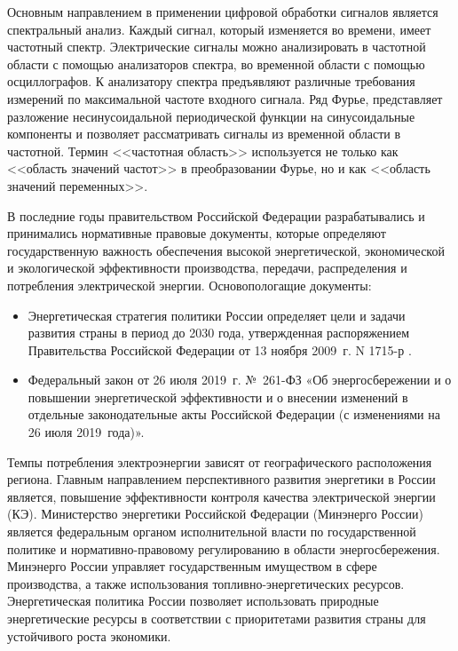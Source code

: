 Основным направлением в применении цифровой обработки сигналов является спектральный анализ. Каждый сигнал, который изменяется во времени, имеет частотный спектр. Электрические сигналы можно анализировать в частотной области с помощью анализаторов спектра, во временной области с помощью осциллографов. К анализатору спектра предъявляют различные требования измерений по максимальной  частоте входного сигнала. Ряд Фурье, представляет разложение несинусоидальной периодической функции на синусоидальные компоненты и позволяет рассматривать сигналы из временной области в частотной. Термин <<частотная область>> используется не только как <<область значений частот>> в преобразовании Фурье, но и как <<область значений переменных>>.

В последние годы правительством Российской Федерации разрабатывались и принимались нормативные правовые документы, которые
определяют государственную важность обеспечения высокой
энергетической, экономической и экологической эффективности производства,
передачи, распределения и потребления электрической энергии. Основопологащие документы:
\begin{itemize}
	\item Энергетическая стратегия политики России определяет цели и задачи развития страны в период до 2030 года, утвержденная распоряжением Правительства Российской Федерации от 13 ноября 2009~г. N 1715-р \cite{energy_strategy}. 
	\item Федеральный закон от 26 июля 2019~г. №~261-ФЗ «Об энергосбережении и о повышении энергетической эффективности и о внесении изменений в отдельные законодательные акты Российской Федерации (с изменениями на 26 июля 2019~года)»\cite{energy_saving_law_2019}.
\end{itemize}


Темпы потребления электроэнергии зависят от географического расположения региона. Главным направлением перспективного развития энергетики в России является, повышение эффективности контроля качества электрической энергии (КЭ). 
Министерство энергетики Российской Федерации (Минэнерго России) является федеральным органом исполнительной власти по государственной политике и нормативно-правовому регулированию в области энергосбережения. Минэнерго России управляет государственным имуществом в сфере производства, а также использования топливно-энергетических ресурсов. Энергетическая политика России позволяет использовать природные энергетические ресурсы в соответствии с приоритетами развития страны для устойчивого роста экономики. 

